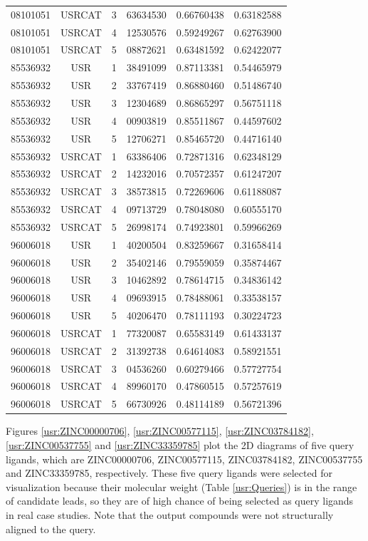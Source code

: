 \begin{longtable}{cccccc}
08101051 & USRCAT & 3 & 63634530 & 0.66760438 & 0.63182588\\
08101051 & USRCAT & 4 & 12530576 & 0.59249267 & 0.62763900\\
08101051 & USRCAT & 5 & 08872621 & 0.63481592 & 0.62422077\\
\hline
85536932 & USR    & 1 & 38491099 & 0.87113381 & 0.54465979\\%
85536932 & USR    & 2 & 33767419 & 0.86880460 & 0.51486740\\
85536932 & USR    & 3 & 12304689 & 0.86865297 & 0.56751118\\
85536932 & USR    & 4 & 00903819 & 0.85511867 & 0.44597602\\
85536932 & USR    & 5 & 12706271 & 0.85465720 & 0.44716140\\
85536932 & USRCAT & 1 & 63386406 & 0.72871316 & 0.62348129\\%
85536932 & USRCAT & 2 & 14232016 & 0.70572357 & 0.61247207\\
85536932 & USRCAT & 3 & 38573815 & 0.72269606 & 0.61188087\\
85536932 & USRCAT & 4 & 09713729 & 0.78048080 & 0.60555170\\
85536932 & USRCAT & 5 & 26998174 & 0.74923801 & 0.59966269\\
\hline
96006018 & USR    & 1 & 40200504 & 0.83259667 & 0.31658414\\%
96006018 & USR    & 2 & 35402146 & 0.79559059 & 0.35874467\\
96006018 & USR    & 3 & 10462892 & 0.78614715 & 0.34836142\\
96006018 & USR    & 4 & 09693915 & 0.78488061 & 0.33538157\\
96006018 & USR    & 5 & 40206470 & 0.78111193 & 0.30224723\\
96006018 & USRCAT & 1 & 77320087 & 0.65583149 & 0.61433137\\%
96006018 & USRCAT & 2 & 31392738 & 0.64614083 & 0.58921551\\
96006018 & USRCAT & 3 & 04536260 & 0.60279466 & 0.57727754\\
96006018 & USRCAT & 4 & 89960170 & 0.47860515 & 0.57257619\\
96006018 & USRCAT & 5 & 66730926 & 0.48114189 & 0.56721396\\
\hline
\end{longtable}

Figures \ref{usr:ZINC00000706}, \ref{usr:ZINC00577115}, \ref{usr:ZINC03784182}, \ref{usr:ZINC00537755} and \ref{usr:ZINC33359785} plot the 2D diagrams of five query ligands, which are ZINC00000706, ZINC00577115, ZINC03784182, ZINC00537755 and ZINC33359785, respectively. These five query ligands were selected for visualization because their molecular weight (Table \ref{usr:Queries}) is in the range of candidate leads, so they are of high chance of being selected as query ligands in real case studies. Note that the output compounds were not structurally aligned to the query.

